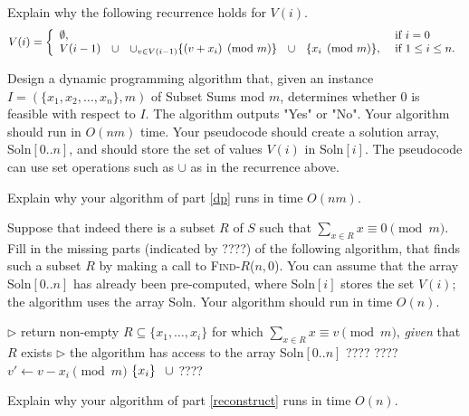 \documentclass[11pt,fleqn]{exam}
\begin{document}
\begin{questions}
\question[3]
Explain why the following recurrence holds for $V(i)$.
\[
   V(i) = \left\{
   \begin{array}{ll}
   \emptyset, & \mbox{ if } i = 0 \\
   V(i-1) \hspace{.1in} \cup \hspace{.1in} \cup_{v \in V(i-1)} \{ (v + x_i) \pmod m \} \hspace{.1in} \cup \hspace{.1in} \{ x_i \pmod m \}, & \mbox{ if } 1 \le i \le n.
   \end{array}
   \right.
   \]
   

\question[5]
\label{dp}
Design a dynamic programming algorithm that, given an instance $I = (\{x_1,x_2, \ldots, x_n\}, m)$ of Subset Sums mod $m$, determines whether 0 is feasible with respect to $I$. The algorithm outputs "Yes" or "No".  Your algorithm should run in $O(nm)$ time. Your pseudocode should create a solution array, Soln$[0..n]$, and should store the set of values $V(i)$ in Soln$[i]$. The pseudocode can use set operations such as $\cup$ as in the recurrence above.

\question[2]
Explain why your algorithm of part \ref{dp} runs in time $O(n m)$.

\question[3]
\label{reconstruct}
Suppose that indeed there is a subset $R$ of $S$ such that $\sum_{x  \in R} x \equiv 0 \pmod m$.  Fill in the missing parts (indicated by ????) of the following algorithm, that finds such a subset
$R$ by making a call to \textsc{Find-$R$($n,0$)}.
You can assume that the array Soln$[0..n]$ has already been pre-computed, where Soln$[i]$ stores the set $V(i)$; the algorithm uses the array Soln. Your algorithm should run in time $O(n)$.

\begin{algorithmic}
   \State $\triangleright$ return non-empty $R \subseteq \{x_1,\ldots,x_i\}$ for which $\sum_{x \in R} x \equiv v \pmod m$, {\em given} that $R$ exists
   \State  $\triangleright$ the algorithm has access to the array Soln$[0..n]$
      \State  ????
         \State \Return ????
    \Else
         \State $v' \gets v - x_i \pmod m$
         \State \Return $\{ x_i \} \hspace{.1in} \cup$ ????
    \EndIf
\EndProcedure
\end{algorithmic}

\question[2]
Explain why your algorithm of part \ref{reconstruct} runs in time $O(n)$.

\end{questions}
\end{document}
